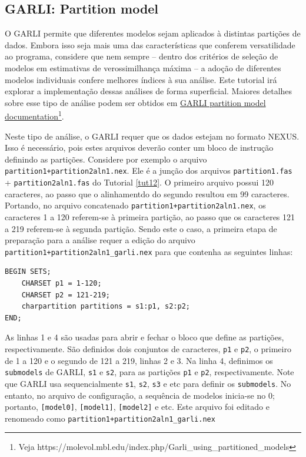 \begin{refsection}
\subsection{GARLI: Partition model}\label{tut13:static_garli_partition}

O GARLI permite que diferentes modelos sejam aplicados à distintas partições de dados. Embora isso seja mais uma das características que conferem versatilidade ao programa, considere que nem sempre -- dentro dos critérios de seleção de modelos em estimativas de verossimilhança máxima -- a adoção de diferentes modelos individuais confere melhores índices à sua análise. Este tutorial irá explorar a implementação dessas análises de forma superficial. Maiores detalhes sobre esse tipo de análise podem ser obtidos em \href{https://molevol.mbl.edu/index.php/Garli_using_partitioned_models}{GARLI partition model documentation}\footnote{ Veja https://molevol.mbl.edu/index.php/Garli\_using\_partitioned\_models}.

Neste tipo de análise, o GARLI requer que os dados estejam no formato NEXUS. Isso é necessário, pois estes arquivos deverão conter um bloco de instrução definindo as partições. Considere por exemplo o arquivo \texttt{partition1+partition2aln1.nex}. Ele é a junção dos arquivos \texttt{partition1.fas} + \texttt{partition2aln1.fas} do Tutorial \ref{tut12}. O primeiro arquivo possui 120 caracteres, ao passo que o alinhamentdo do segundo resultou em 99 caracteres. Portando, no arquivo concatenado \texttt{partition1+partition2aln1.nex}, os caracteres 1 a 120 referem-se à primeira partição, ao passo que os caracteres 121 a 219 referem-se à segunda partição. Sendo este o caso, a primeira etapa de preparação para a análise requer a edição do arquivo \texttt{partition1+partition2aln1\_garli.nex} para que contenha as seguintes linhas:


\begin{lstlisting}[label=tut3:ls1]
BEGIN SETS;
	CHARSET p1 = 1-120;
	CHARSET p2 = 121-219;
	charpartition partitions = s1:p1, s2:p2;
END;
\end{lstlisting}

As linhas 1 e 4 são usadas para abrir e fechar o bloco que define as partições, respectivamente. São definidos dois conjuntos de caracteres, \texttt{p1} e \texttt{p2}, o primeiro de 1 a 120 e o segundo de 121 a 219, linhas 2 e 3. Na linha 4, definimos os \texttt{submodels} de GARLI, \texttt{s1} e \texttt{s2}, para as partições \texttt{p1} e \texttt{p2}, respectivamente. Note que GARLI usa sequencialmente \texttt{s1}, \texttt{s2}, \texttt{s3} e etc para definir os \texttt{submodels}. No entanto, no arquivo de configuração, a sequência de modelos inicia-se no 0; portanto, \texttt{[model0]}, \texttt{[model1]}, \texttt{[model2]} e etc. Este arquivo foi editado e renomeado como \texttt{partition1+partition2aln1\_garli.nex}


\end{refsection}
